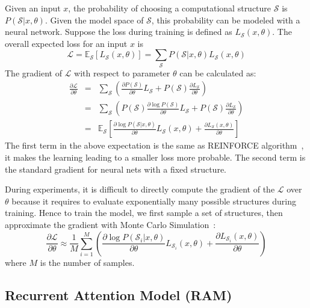 \documentclass[10pt,twocolumn,letterpaper]{article}
\newcommand{\pian}[2]{\frac{\partial #1}{\partial #2}}
\begin{document}
Given an input $x$, the probability of choosing a computational structure $\mathcal{S}$ is $P(\mathcal{S}|x, \theta)$.
Given the model space of $\mathcal{S}$, this probability can be modeled with a neural network.
Suppose the loss during training is defined as $L_\mathcal{S}(x, \theta)$.
The overall expected loss for an input $x$ is
\begin{equation}
\mathcal{L} = \mathbb{E}_\mathcal{S} \left[L_\mathcal{S}(x, \theta)\right] = \sum_{\mathcal{S}} P(\mathcal{S}|x, \theta) L_\mathcal{S}(x, \theta)
\label{eq:loss}
\end{equation}
The gradient of $\mathcal{L}$ with respect to parameter $\theta$ can be calculated as:
\begin{eqnarray*}
\pian{\mathcal{L}}{\theta} &=& \sum_{\mathcal{S}} \left(\pian{P(\mathcal{S})}{\theta} L_\mathcal{S} + P(\mathcal{S}) \pian{L_\mathcal{S}}{\theta}\right) \\
&=& \sum_{\mathcal{S}} \left(P(\mathcal{S}) \pian{\log P(\mathcal{S})}{\theta} L_\mathcal{S} + P(\mathcal{S}) \pian{L_\mathcal{S}}{\theta}\right) \\
&=& \mathbb{E}_\mathcal{S}\left[\pian{\log P(\mathcal{S}|x, \theta)}{\theta} L_\mathcal{S}(x, \theta) + \pian{L_\mathcal{S}(x, \theta)}{\theta}\right]
\end{eqnarray*}
The first term in the above expectation is the same as REINFORCE algorithm~\cite{sutton1999policy}, it makes the learning leading to a smaller loss more probable. The second term is the standard gradient for neural nets with a fixed structure.

During experiments, it is difficult to directly compute the gradient of the $\mathcal{L}$ over $\theta$ because it requires to evaluate exponentially many possible structures during training.
Hence to train the model, we first sample a set of structures, then approximate the gradient with Monte Carlo Simulation~\cite{sutton1999policy}:
\begin{equation}
\pian{\mathcal{L}}{\theta} \approx \frac{1}{M} \sum_{i=1}^M \left( \pian{\log P(\mathcal{S}_i|x, \theta)}{\theta} L_{\mathcal{S}_i}(x, \theta) + \pian{L_{\mathcal{S}_i}(x, \theta)}{\theta} \right)
\label{eq:train}
\end{equation}
where $M$ is the number of samples.

\subsection{Recurrent Attention Model (RAM)}
\end{document}
